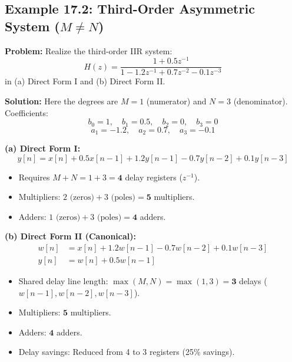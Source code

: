 \documentclass[11pt,a4paper]{article}
\begin{document}
\vspace{0.4cm}
\subsection{\texorpdfstring{Example 17.2: Third-Order Asymmetric System ($M \neq N$)}{Example 17.2: Third-Order Asymmetric System (M != N)}}
\textbf{Problem:} Realize the third-order IIR system:
\begin{equation}
H(z) = \frac{1 + 0.5 z^{-1}}{1 - 1.2 z^{-1} + 0.7 z^{-2} - 0.1 z^{-3}}
\end{equation}
in (a) Direct Form I and (b) Direct Form II.

\vspace{0.3cm}
\noindent\textbf{Solution:}
Here the degrees are $M = 1$ (numerator) and $N = 3$ (denominator).
Coefficients:
\begin{equation}
b_0 = 1, \quad b_1 = 0.5, \quad b_2 = 0, \quad b_3 = 0
\end{equation}
\begin{equation}
a_1 = -1.2, \quad a_2 = 0.7, \quad a_3 = -0.1
\end{equation}

\noindent\textbf{(a) Direct Form I:}
\begin{equation}
y[n] = x[n] + 0.5 x[n-1] + 1.2 y[n-1] - 0.7 y[n-2] + 0.1 y[n-3]
\end{equation}
\begin{itemize}
    \item Requires $M + N = 1 + 3 = \mathbf{4}$ delay registers ($z^{-1}$).
    \item Multipliers: $2 \text{ (zeros)} + 3 \text{ (poles)} = \mathbf{5}$ multipliers.
    \item Adders: $1 \text{ (zeros)} + 3 \text{ (poles)} = \mathbf{4}$ adders.
\end{itemize}

\noindent\textbf{(b) Direct Form II (Canonical):}
\begin{align}
w[n] &= x[n] + 1.2 w[n-1] - 0.7 w[n-2] + 0.1 w[n-3] \\
y[n] &= w[n] + 0.5 w[n-1]
\end{align}
\begin{itemize}
    \item Shared delay line length: $\max(M, N) = \max(1, 3) = \mathbf{3}$ delays ($w[n-1], w[n-2], w[n-3]$).
    \item Multipliers: $\mathbf{5}$ multipliers.
    \item Adders: $\mathbf{4}$ adders.
    \item Delay savings: Reduced from 4 to 3 registers (25\% savings).
\end{itemize}
\end{document}
